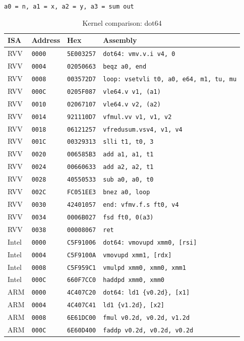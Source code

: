 \begin{table}[htbp]
\centering
\caption{Kernel comparison: dot64}
\begingroup
\scriptsize
\setlength{\tabcolsep}{4pt}
\noindent \texttt{a0 = n, a1 = x, a2 = y, a3 = sum out}\par
\vspace{0.6ex}
\begin{tabular}{@{}l|l|l|p{7.2cm}@{}}
\toprule
ISA & Address & Hex & Assembly \\
\midrule
RVV & \texttt{0000} & \texttt{5E003257} & \texttt{dot64: vmv.v.i v4, 0} \\
RVV & \texttt{0004} & \texttt{02050663} & \texttt{beqz a0, end} \\
RVV & \texttt{0008} & \texttt{003572D7} & \texttt{loop: vsetvli t0, a0, e64, m1, tu, mu} \\
RVV & \texttt{000C} & \texttt{0205F087} & \texttt{vle64.v v1, (a1)} \\
RVV & \texttt{0010} & \texttt{02067107} & \texttt{vle64.v v2, (a2)} \\
RVV & \texttt{0014} & \texttt{921110D7} & \texttt{vfmul.vv v1, v1, v2} \\
RVV & \texttt{0018} & \texttt{06121257} & \texttt{vfredusum.vsv4, v1, v4} \\
RVV & \texttt{001C} & \texttt{00329313} & \texttt{slli t1, t0, 3} \\
RVV & \texttt{0020} & \texttt{006585B3} & \texttt{add a1, a1, t1} \\
RVV & \texttt{0024} & \texttt{00660633} & \texttt{add a2, a2, t1} \\
RVV & \texttt{0028} & \texttt{40550533} & \texttt{sub a0, a0, t0} \\
RVV & \texttt{002C} & \texttt{FC051EE3} & \texttt{bnez a0, loop} \\
RVV & \texttt{0030} & \texttt{42401057} & \texttt{end: vfmv.f.s ft0, v4} \\
RVV & \texttt{0034} & \texttt{0006B027} & \texttt{fsd ft0, 0(a3)} \\
RVV & \texttt{0038} & \texttt{00008067} & \texttt{ret} \\
\midrule
Intel & \texttt{0000} & \texttt{C5F91006} & \texttt{dot64: vmovupd xmm0, [rsi]} \\
Intel & \texttt{0004} & \texttt{C5F9100A} & \texttt{vmovupd xmm1, [rdx]} \\
Intel & \texttt{0008} & \texttt{C5F959C1} & \texttt{vmulpd xmm0, xmm0, xmm1} \\
Intel & \texttt{000C} & \texttt{660F7CC0} & \texttt{haddpd xmm0, xmm0} \\
\midrule
ARM & \texttt{0000} & \texttt{4C407C20} & \texttt{dot64: ld1 \{v0.2d\}, [x1]} \\
ARM & \texttt{0004} & \texttt{4C407C41} & \texttt{ld1 \{v1.2d\}, [x2]} \\
ARM & \texttt{0008} & \texttt{6E61DC00} & \texttt{fmul v0.2d, v0.2d, v1.2d} \\
ARM & \texttt{000C} & \texttt{6E60D400} & \texttt{faddp v0.2d, v0.2d, v0.2d} \\
\bottomrule
\end{tabular}
\endgroup
\end{table}
\noindent{}\par
